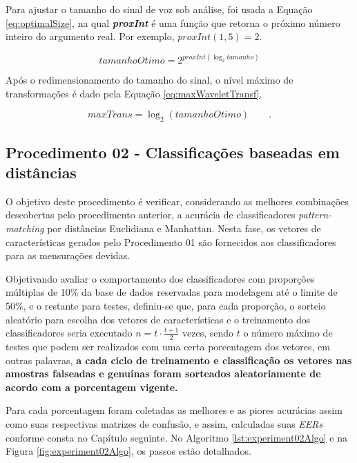 		\par Para ajustar o tamanho do sinal de voz sob análise, foi usada a Equação \ref{eq:optimalSize}, na qual \textit{\textbf{proxInt}} é uma função que retorna o próximo número inteiro do argumento real. Por exemplo, $proxInt(1,5) = 2$.

		\begin{equation}
			tamanhoOtimo=2^{proxInt(\log_{2}tamanho)}
			\label{eq:optimalSize}
		\end{equation} 
		
		\par Após o redimensionamento do tamanho do sinal, o nível máximo de transformações é dado pela Equação \ref{eq:maxWaveletTransf}. 
				
		\begin{equation}
			maxTrans=\log_{2}(tamanhoOtimo) \qquad.
			\label{eq:maxWaveletTransf}
		\end{equation}
		
		\subsection{Procedimento 02 - Classificações baseadas em distâncias}
		\label{chap:propApproach:sec:Experimento02}
		\par O objetivo deste procedimento é verificar, considerando as melhores combinações descobertas pelo procedimento anterior, a acurácia de classificadores \textit{pattern-matching} por distâncias Euclidiana e Manhattan. Nesta fase, os vetores de características gerados pelo Procedimento 01 são fornecidos aos classificadores para as mensurações devidas.
				
		\par Objetivando avaliar o comportamento dos classificadores com proporções múltiplas de 10\% da base de dados reservadas para modelagem até o limite de 50\%, e o restante para testes, definiu-se que, para cada proporção, o sorteio aleatório para escolha dos vetores de características e o treinamento dos classificadores seria executado $n=t \cdot \frac{t+1}{2}$ vezes, sendo $t$ o número máximo de testes que podem ser realizados com uma certa porcentagem dos vetores, em outras palavras, \textbf{a cada ciclo de treinamento e classificação os vetores nas amostras falseadas e genuínas foram sorteados aleatoriamente de acordo com a porcentagem vigente.}
				
		\par Para cada porcentagem foram coletadas as melhores e as piores acurácias assim como suas respectivas matrizes de confusão, e assim, calculadas suas \textit{EERs} conforme consta no Capítulo seguinte. No Algoritmo \ref{lst:experiment02Algo} e na Figura \ref{fig:experiment02Algo}, os passos estão detalhados.
		
